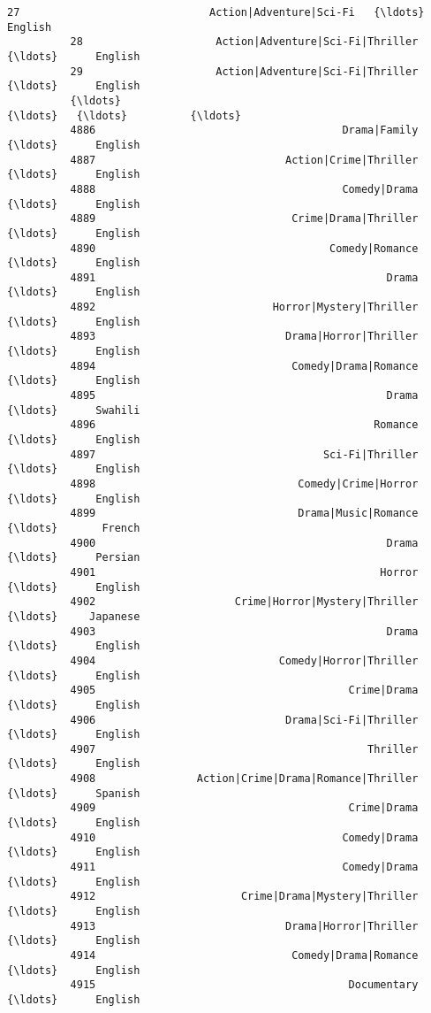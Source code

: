 \documentclass[11pt]{article}
\begin{document}
\begin{Verbatim}[commandchars=\\\{\}]
          27                              Action|Adventure|Sci-Fi   {\ldots}      English   
          28                     Action|Adventure|Sci-Fi|Thriller   {\ldots}      English   
          29                     Action|Adventure|Sci-Fi|Thriller   {\ldots}      English   
          {\ldots}                                                 {\ldots}   {\ldots}          {\ldots}   
          4886                                       Drama|Family   {\ldots}      English   
          4887                              Action|Crime|Thriller   {\ldots}      English   
          4888                                       Comedy|Drama   {\ldots}      English   
          4889                               Crime|Drama|Thriller   {\ldots}      English   
          4890                                     Comedy|Romance   {\ldots}      English   
          4891                                              Drama   {\ldots}      English   
          4892                            Horror|Mystery|Thriller   {\ldots}      English   
          4893                              Drama|Horror|Thriller   {\ldots}      English   
          4894                               Comedy|Drama|Romance   {\ldots}      English   
          4895                                              Drama   {\ldots}      Swahili   
          4896                                            Romance   {\ldots}      English   
          4897                                    Sci-Fi|Thriller   {\ldots}      English   
          4898                                Comedy|Crime|Horror   {\ldots}      English   
          4899                                Drama|Music|Romance   {\ldots}       French   
          4900                                              Drama   {\ldots}      Persian   
          4901                                             Horror   {\ldots}      English   
          4902                      Crime|Horror|Mystery|Thriller   {\ldots}     Japanese   
          4903                                              Drama   {\ldots}      English   
          4904                             Comedy|Horror|Thriller   {\ldots}      English   
          4905                                        Crime|Drama   {\ldots}      English   
          4906                              Drama|Sci-Fi|Thriller   {\ldots}      English   
          4907                                           Thriller   {\ldots}      English   
          4908                Action|Crime|Drama|Romance|Thriller   {\ldots}      Spanish   
          4909                                        Crime|Drama   {\ldots}      English   
          4910                                       Comedy|Drama   {\ldots}      English   
          4911                                       Comedy|Drama   {\ldots}      English   
          4912                       Crime|Drama|Mystery|Thriller   {\ldots}      English   
          4913                              Drama|Horror|Thriller   {\ldots}      English   
          4914                               Comedy|Drama|Romance   {\ldots}      English   
          4915                                        Documentary   {\ldots}      English   
          

\end{Verbatim}
\end{document}
